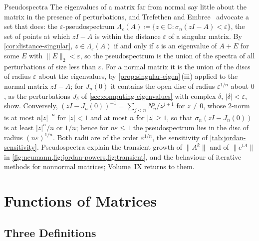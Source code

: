 \begin{note}{Pseudospectra}
The eigenvalues of a matrix far from normal say little about the matrix in the presence of perturbations, and Trefethen and Embree~\cite{trefethen2005} advocate a set that does: the $\varepsilon$-pseudospectrum $\Lambda_\varepsilon(A)\coloneqq\{z\in\mathbb C:\sigma_n(zI-A)<\varepsilon\}$, the set of points at which $zI-A$ is within the distance $\varepsilon$ of a singular matrix. By \cref{cor:distance-singular}, $z\in\Lambda_\varepsilon(A)$ if and only if $z$ is an eigenvalue of $A+E$ for some $E$ with $\|E\|_2<\varepsilon$, so the pseudospectrum is the union of the spectra of all perturbations of size less than $\varepsilon$. For a normal matrix it is the union of the discs of radius $\varepsilon$ about the eigenvalues, by \cref{prop:singular-eigen}\,(iii) applied to the normal matrix $zI-A$; for $J_n(0)$ it contains the open disc of radius $\varepsilon^{1/n}$ about $0$, as the perturbations $J_\delta$ of \cref{sec:computing-eigenvalues} with complex $\delta$, $|\delta|<\varepsilon$, show. Conversely, $(zI-J_n(0))^{-1}=\sum_{j<n}N_n^j/z^{j+1}$ for $z\ne0$, whose $2$-norm is at most $n|z|^{-n}$ for $|z|<1$ and at most $n$ for $|z|\ge1$, so that $\sigma_n(zI-J_n(0))$ is at least $|z|^n/n$ or $1/n$; hence for $n\varepsilon\le1$ the pseudospectrum lies in the disc of radius $(n\varepsilon)^{1/n}$. Both radii are of the order $\varepsilon^{1/n}$, the sensitivity of \cref{tab:jordan-sensitivity}. Pseudospectra explain the transient growth of $\|A^k\|$ and of $\|e^{tA}\|$ in \cref{fig:neumann,fig:jordan-powers,fig:transient}, and the behaviour of iterative methods for nonnormal matrices; Volume~IX returns to them.
\end{note}

\section{Functions of Matrices}
\label{sec:matrix-functions}

\subsection{Three Definitions}

